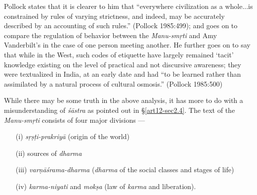 Pollock states that it is clearer to him that ``everywhere civilization as a whole...is constrained by rules of varying strictness, and indeed, may be accurately described by an accounting of such rules.'' (Pollock 1985:499); and goes on to compare the regulation of behavior between the {\sl Manu-smṛti} and Amy Vanderbilt's in the case of one person meeting another. He further goes on to say that while in the West, such codes of etiquette have largely remained `tacit' knowledge existing on the level of practical and not discursive awareness; they were textualized in India, at an early date and had ``to be learned rather than assimilated by a natural process of cultural osmosis.'' (Pollock 1985:500) 

While there may be some truth in the above analysis, it has more to do with a misunderstanding of {\sl śāstra} as pointed out in \S\ref{art12-sec2.4}. The text of the {\sl Manu-smṛti} consists of four major divisions ---
\begin{itemize}
\itemsep=1pt
\item[(i)] {\sl sṛṣṭi-prakriyā} (origin of the world)

\item[(ii)] sources of {\sl dharma}

\item[(iii)] {\sl varṇāśrama-dharma} ({\sl dharma} of the social classes and stages of life)

\item[(iv)] {\sl karma-niyati} and {\sl mokṣa} (law of {\sl karma} and liberation).
\end{itemize}

